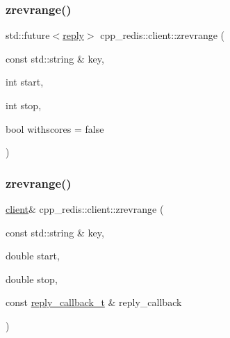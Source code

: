 \subsubsection{\texorpdfstring{zrevrange()}{zrevrange()}\hspace{0.1cm}{\footnotesize\ttfamily [3/9]}}
{\footnotesize\ttfamily std\+::future$<$\hyperlink{classcpp__redis_1_1reply}{reply}$>$ cpp\+\_\+redis\+::client\+::zrevrange (\begin{DoxyParamCaption}\item[{const std\+::string \&}]{key,  }\item[{int}]{start,  }\item[{int}]{stop,  }\item[{bool}]{withscores = {\ttfamily false} }\end{DoxyParamCaption})}

\mbox{\label{classcpp__redis_1_1client_a7b20d0dc47cf4fb40220e51408876d6d}} 
\subsubsection{\texorpdfstring{zrevrange()}{zrevrange()}\hspace{0.1cm}{\footnotesize\ttfamily [4/9]}}
{\footnotesize\ttfamily \hyperlink{classcpp__redis_1_1client}{client}\& cpp\+\_\+redis\+::client\+::zrevrange (\begin{DoxyParamCaption}\item[{const std\+::string \&}]{key,  }\item[{double}]{start,  }\item[{double}]{stop,  }\item[{const \hyperlink{classcpp__redis_1_1client_a061a1140d36d2eaeda82b09a0bb3f9f2}{reply\+\_\+callback\+\_\+t} \&}]{reply\+\_\+callback }\end{DoxyParamCaption})}

\mbox{\label{classcpp__redis_1_1client_ac03871ced545f10c9f277fd5fc20f0a0}} 
